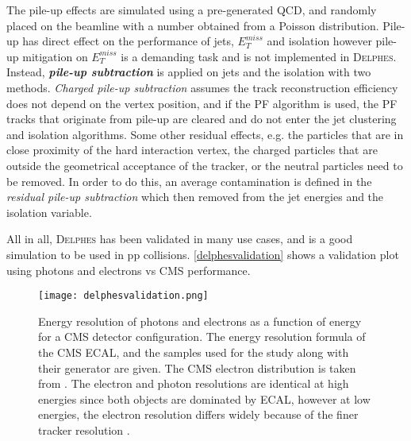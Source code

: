 {The pile-up effects are simulated using a pre-generated QCD, and randomly placed on the beamline with a number obtained from a Poisson distribution. Pile-up has direct effect on the performance of jets, $E_T^{miss}$ and isolation however pile-up mitigation on $E_T^{miss}$ is a demanding task and is not implemented in \textsc{Delphes}. Instead, \emph{\bf{pile-up subtraction}} is applied on jets and the isolation with two methods. \emph{Charged pile-up subtraction} assumes the track reconstruction efficiency does not depend on the vertex position, and if the PF algorithm is used, the PF tracks that originate from pile-up are cleared and do not enter the jet clustering and isolation algorithms. Some other residual effects, e.g. the particles that are in close proximity of the hard interaction vertex, the charged particles that are outside the geometrical acceptance of the tracker, or the neutral particles need to be removed. In order to do this, an average contamination is defined in the \emph{residual pile-up subtraction} which then removed from the jet energies and the isolation variable.

All in all, \textsc{Delphes} has been validated in many use cases, and is a good simulation to be used in pp collisions. \autoref{delphesvalidation} shows a validation plot using photons and electrons vs CMS performance.

\begin{figure}[ht]
	\centering
	\texttt{[image: delphesvalidation.png]}
	\vspace{2mm}
	\caption[Energy resolution of photons and electrons as a function of energy for a CMS detector configuration.  The energy resolution formula of the CMS ECAL, and the samples used for the study along with their generator are given. The CMS electron distribution is taken from . The electron and photon resolutions are identical at high energies since both objects are dominated by ECAL, however at low energies, the electron resolution differs widely because of the finer tracker resolution.]
	{Energy resolution of photons and electrons as a function of energy for a CMS detector configuration.  The energy resolution formula of the CMS ECAL, and the samples used for the study along with their generator are given. The CMS electron distribution is taken from \cite{CMS:2013hoa}. The electron and photon resolutions are identical at high energies since both objects are dominated by ECAL, however at low energies, the electron resolution differs widely because of the finer tracker resolution \cite{deFavereau2014}.}
	\label{delphesvalidation}
\end{figure}

}
